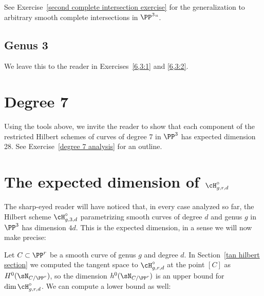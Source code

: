 See Exercise~\ref{second complete intersection exercise} for the
generalization to arbitrary smooth complete intersections in $\PP^3` `$.

\subsection*{Genus 3}
We leave this to the reader in Exercises~\ref{6,3:1}
and
\ref{6,3:2}.

\section{Degree 7}

Using the tools above, we invite the reader to show that each component
of the restricted Hilbert schemes of curves of degree 7
in $\PP^3$ has expected dimension 28. See Exercise~\ref{degree 7 analysis}
for an outline.


\section{The expected dimension of
\texorpdfstring{$\cH^\circ_{g,r,d}$}{$H_{g,r,d}$}}\label{chi N}


The sharp-eyed reader will have noticed that,
in every case analyzed so far,  the Hilbert scheme
$\cH^\circ_{g,3,d}$ parametrizing smooth curves of degree $d$ and genus
%
$g$ in $\PP^3$ has dimension $4d$.
This is the
expected dimension,
%
in a sense we will now make precise:

Let $C\subset \PP^r$ be a smooth curve of genus $g$ and degree $d$. In
Section~\ref{tan hilbert section}
we computed the tangent space to $\cH^\circ_{g,r,d}$ at the point $[C]$
as $H^0(\sN_{C/\PP^r})$, so
the dimension $h^0( \sN_{C/\PP^r})$ is an upper bound for $\dim
\cH^\circ_{g,r,d}$. We can compute a lower bound as well:

